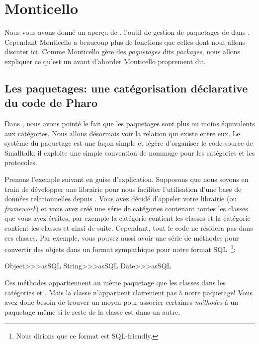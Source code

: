 \documentclass[a4paper,10pt,twoside]{book}
\begin{document}
\section{Monticello}

Nous vous avons donné un aperçu de , l'outil de gestion
de paquetages de \pharo dans .  
Cependant Monticello a beaucoup plus de fonctions que celles dont nous allons
discuter ici.
Comme Monticello gère des \emph{paquetages} dits \emph{packages}, nous allons expliquer ce qu'est
un  avant d'aborder Monticello proprement dit.

\subsection{Les paquetages: une catégorisation déclarative du code de Pharo}

Dans , nous avons pointé le fait
que les paquetages sont plus ou moins équivalents aux catégories. 
Nous allons désormais voir la relation qui existe entre eux.
Le système du paquetage est une façon simple et légère
d'organiser le code source de Smalltalk; il exploite une simple
convention de nommage pour les catégories et les protocoles.

Prenons l'exemple suivant en guise d'explication.
Supposons que nous soyons en train de développer une librairie pour
nous faciliter l'utilisation d'une base de données relationnelles depuis
\pharo. Vous avez décidé d'appeler votre librairie (ou \emph{framework})
 et vous avez créé une série de catégories
contenant toutes les classes que vous avez écrites, par exemple la catégorie
 contient les classes
 et la catégorie
 contient les classes
et ainsi de suite. Cependant, tout le code ne résidera pas dans ces classes.
Par exemple, vous pouvez aussi avoir une série de méthodes pour 
convertir des objets dans un format sympathique pour notre format
SQL~\footnote{Nous dirions que ce format est SQL-friendly.}:

\begin{code}{}
Object>>>asSQL
String>>>asSQL
Date>>>asSQL
\end{code}

\noindent
Ces méthodes appartiennent au même paquetage que les classes
dans les catégories  et .
Mais la classe  n'appartient clairement pas à notre paquetage!
Vous avez donc besoin de trouver un moyen pour associer certaines
\emph{méthodes} à un paquetage même si le reste de la classe est dans
un autre. 
\end{document}
